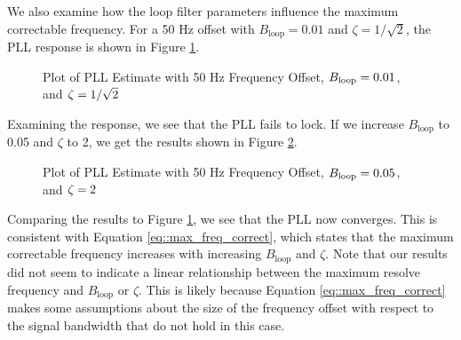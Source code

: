 \documentclass{article}
\begin{document}
We also examine how the loop filter parameters influence the maximum correctable frequency. For a 50 Hz offset with $B_{\text{loop}} = 0.01$ and $\zeta = 1/\sqrt{2}$, the PLL response is shown in Figure \ref{fig::convergence_Bloop_0p01_damp_sqrt_2_foff_50}.

\begin{figure}[H]
	\centerline{}
	\caption{Plot of PLL Estimate with 50 Hz Frequency Offset, $\protect{B_\text{loop}} = 0.01$, and $\protect{\zeta = 1/\sqrt{2}}$}
	\label{fig::convergence_Bloop_0p01_damp_sqrt_2_foff_50}
\end{figure}

\noindent Examining the response, we see that the PLL fails to lock. If we increase $B_{\text{loop}}$ to 0.05 and $\zeta$ to 2, we get the results shown in Figure \ref{fig::convergence_Bloop_0p05_damp_2_foff_50}.

\begin{figure}[H]
	\centerline{}
	\caption{Plot of PLL Estimate with 50 Hz Frequency Offset, $\protect{B_\text{loop}} = 0.05$, and $\protect{\zeta = 2}$}
	\label{fig::convergence_Bloop_0p05_damp_2_foff_50}
\end{figure}

\noindent Comparing the results to Figure \ref{fig::convergence_Bloop_0p01_damp_sqrt_2_foff_50}, we see that the PLL now converges. This is consistent with Equation \ref{eq::max_freq_correct}, which states that the maximum correctable frequency increases with increasing  $B_{\text{loop}}$ and $\zeta$. Note that our results did not seem to indicate a linear relationship between the maximum resolve frequency and $B_{\text{loop}}$ or $\zeta$. This is likely because Equation \ref{eq::max_freq_correct} makes some assumptions about the size of the frequency offset with respect to the signal bandwidth that do not hold in this case.
\end{document}

